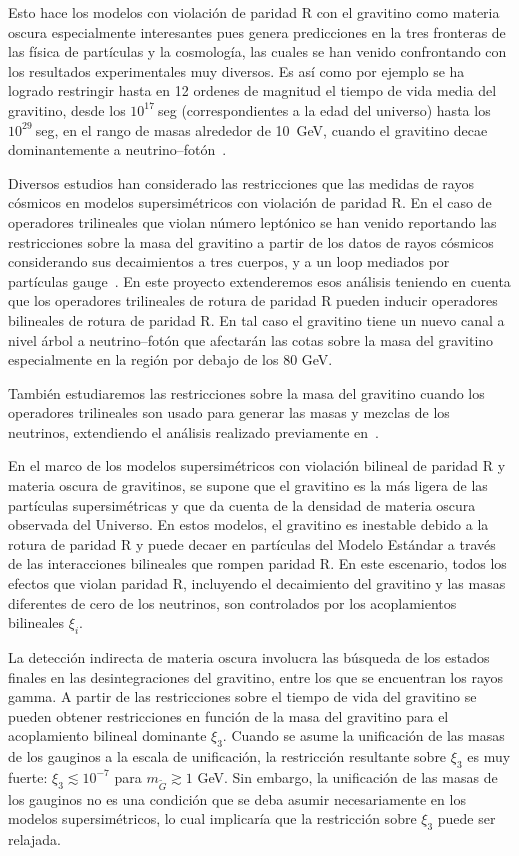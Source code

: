 Esto hace los modelos con violación de paridad R con el gravitino como
materia oscura especialmente interesantes pues genera predicciones en
la tres fronteras de las física de partículas y la cosmología, las
cuales se han venido confrontando con los resultados experimentales
muy diversos. Es así como por ejemplo se ha logrado restringir hasta
en 12 ordenes de magnitud el tiempo de vida media del gravitino, desde
los $10^{17}\ $seg (correspondientes a la edad del universo) hasta los
$10^{29}\ $seg, en el rango de masas alrededor de 10~GeV, cuando el
gravitino decae dominantemente a neutrino--fotón~\cite{}.  

\begin{gravitinodm}

  Diversos estudios han considerado las restricciones que las medidas
  de rayos cósmicos en modelos supersimétricos con violación de
  paridad R. En el caso de operadores trilineales que violan número
  leptónico se han venido reportando las restricciones sobre la masa del
  gravitino a partir de los datos de rayos cósmicos considerando sus
  decaimientos a tres cuerpos, y a un loop mediados por partículas
  gauge~\cite{}. En este proyecto extenderemos esos análisis teniendo en
  cuenta que los operadores trilineales de rotura de paridad R pueden
  inducir operadores bilineales de rotura de paridad R. En tal caso el
  gravitino tiene un nuevo canal a nivel árbol a neutrino--fotón que
  afectarán las cotas sobre la masa del gravitino especialmente en la
  región por debajo de los 80 GeV. 

  También estudiaremos las restricciones sobre la masa del gravitino
  cuando los operadores trilineales son usado para generar las masas y
  mezclas de los neutrinos, extendiendo el análisis realizado
  previamente en~\cite{}.

En el marco de los modelos supersimétricos con violación bilineal de paridad R y materia oscura de gravitinos, se supone que el gravitino es la más ligera de las partículas supersimétricas y que da cuenta de la densidad de materia oscura observada del Universo. En estos modelos, el gravitino es inestable debido a la rotura de paridad R y puede decaer en partículas del Modelo Estándar a través de las interacciones bilineales que rompen paridad R. En este escenario, todos los efectos que violan paridad R, incluyendo el decaimiento del gravitino y las masas diferentes de cero de los neutrinos, son controlados por los acoplamientos bilineales $\xi_i$. 

La detección indirecta de materia oscura involucra las búsqueda de los estados finales en las desintegraciones del gravitino, entre los que se encuentran los rayos gamma. A partir de las restricciones sobre el tiempo de vida del gravitino se pueden obtener restricciones en función de la masa del gravitino para el acoplamiento bilineal dominante $\xi_3$. Cuando se asume la unificación de las masas de los gauginos a la escala de unificación, la restricción resultante sobre $\xi_3$ es muy fuerte: $\xi_3\lesssim 10^{-7}$ para $m_{\tilde G}\gtrsim 1$ GeV.  Sin embargo, la unificación de las masas de los gauginos no es una condición que se deba asumir necesariamente en los modelos supersimétricos, lo cual implicaría que la restricción sobre $\xi_3$ puede ser relajada.


\end{gravitinodm}
